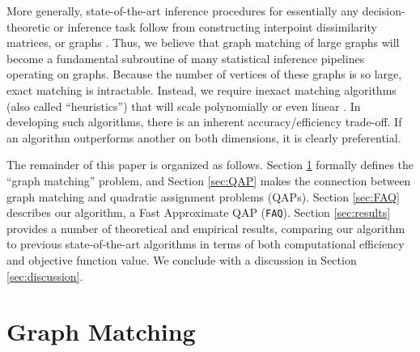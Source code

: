\documentclass[11pt]{article}
\begin{document}
More generally, state-of-the-art inference procedures for essentially any decision-theoretic or inference task follow from constructing interpoint dissimilarity matrices, or graphs \cite{Duin2011}.  Thus, we believe that graph matching of large graphs will become a fundamental subroutine of many statistical inference pipelines operating on graphs. Because the number of vertices of these graphs is so large, exact matching is intractable.   Instead, we require inexact matching algorithms (also called ``heuristics'') that will scale polynomially or even linear \cite{Conte2004}.  In developing such algorithms, there is an inherent accuracy/efficiency trade-off.  If an algorithm outperforms another on both dimensions, it is clearly preferential.  

The remainder of this paper is organized as follows.  Section \ref{sec:GM} formally defines the ``graph matching'' problem, and Section \ref{sec:QAP} makes the connection between graph matching and quadratic assignment problems (QAPs).  Section \ref{sec:FAQ} describes our algorithm, a Fast Approximate QAP (\texttt{FAQ}).  Section \ref{sec:results} provides a number of theoretical and empirical results, comparing our algorithm to previous state-of-the-art algorithms in terms of both computational efficiency and objective function value.  We conclude with a discussion in Section \ref{sec:discussion}.




\section{Graph Matching} %
\label{sec:GM}
\end{document}
